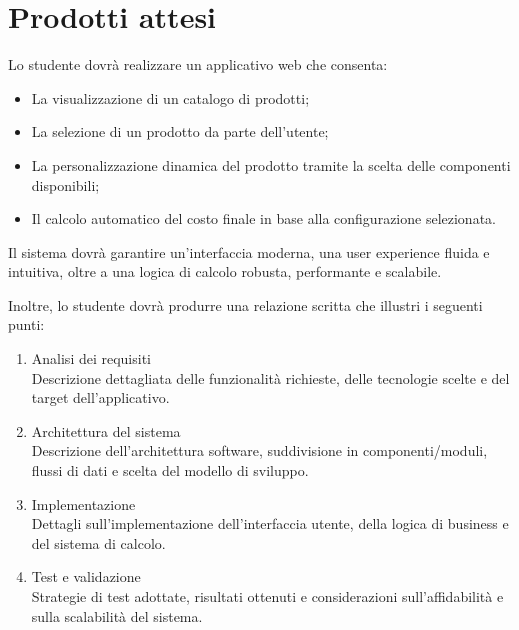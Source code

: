 \section*{Prodotti attesi}
Lo studente dovrà realizzare un applicativo web che consenta:
\begin{itemize}
    \item La visualizzazione di un catalogo di prodotti;
    \item La selezione di un prodotto da parte dell’utente;
    \item La personalizzazione dinamica del prodotto tramite la scelta delle componenti disponibili;
    \item Il calcolo automatico del costo finale in base alla configurazione selezionata.
\end{itemize}

Il sistema dovrà garantire un’interfaccia moderna, una user experience fluida e intuitiva, oltre a una logica di calcolo robusta, performante e scalabile.

\bigskip

Inoltre, lo studente dovrà produrre una relazione scritta che illustri i seguenti punti:
\begin{enumerate}
    \item Analisi dei requisiti \\
    Descrizione dettagliata delle funzionalità richieste, delle tecnologie scelte e del target dell’applicativo.

    \item Architettura del sistema \\
    Descrizione dell’architettura software, suddivisione in componenti/moduli, flussi di dati e scelta del modello di sviluppo.

    \item Implementazione \\
    Dettagli sull’implementazione dell’interfaccia utente, della logica di business e del sistema di calcolo.

    \item Test e validazione \\
    Strategie di test adottate, risultati ottenuti e considerazioni sull’affidabilità e sulla scalabilità del sistema.
\end{enumerate}

